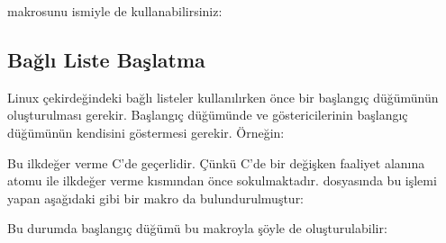 \documentclass[a4paper,10pt,turkish]{sphinxmanual}
\begin{document}
\sphinxAtStartPar
{} makrosunu  ismiyle de kullanabilirsiniz:

\begin{sphinxVerbatim}[commandchars=\\\{\}]
\end{sphinxVerbatim}


\subsection{Bağlı Liste Başlatma}
\label{\detokenize{kernellinkedlistandhashtable:bagli-liste-baslatma}}
\sphinxAtStartPar
Linux çekirdeğindeki bağlı listeler kullanılırken önce bir başlangıç düğümünün oluşturulması gerekir.
Başlangıç düğümünde  ve  göstericilerinin başlangıç düğümünün kendisini göstermesi
gerekir. Örneğin:

\begin{sphinxVerbatim}[commandchars=\\\{\}]
\end{sphinxVerbatim}

\sphinxAtStartPar
Bu ilkdeğer verme C’de geçerlidir. Çünkü C’de bir değişken faaliyet alanına \sphinxcode{\sphinxupquote{=}} atomu ile ilkdeğer
verme kısmından önce sokulmaktadır.  dosyasında bu işlemi yapan aşağıdaki gibi bir makro da
bulundurulmuştur:

\begin{sphinxVerbatim}[commandchars=\\\{\}]
\end{sphinxVerbatim}

\sphinxAtStartPar
Bu durumda başlangıç düğümü bu makroyla şöyle de oluşturulabilir:

\begin{sphinxVerbatim}[commandchars=\\\{\}]
\end{sphinxVerbatim}
\end{document}
